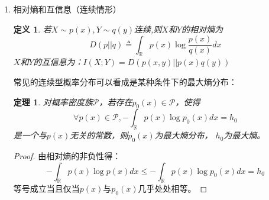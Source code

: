 \documentclass{article}
\newtheorem{definition}{定义}
\newtheorem{thm}{定理}
\newtheorem{pro}{命题}
\begin{document}
\begin{enumerate}
常见分布的微分熵
\begin{pro}
\begin{enumerate}[label=(\alph*)]
\item 区间$(0, a)$ 上的均匀分布的微分熵为 $ \log a $， 可正可负。
\item 方差为$\sigma^2$的高斯分布微分熵的大小为$\frac{1}{2}\log (2\pi e \sigma^2)$，协方差矩阵为$\Sigma$的联合高斯分布微分熵大小为${1\over 2} \log(\det (2\pi e \Sigma ))$
\item 均值为$\frac{1}{\lambda}$的指数分布的微分熵为 $\log e-\log \lambda$
\end{enumerate}
\end{pro}
\begin{proof}
\begin{enumerate}[label=(\alph*)]
\item
不妨设高斯分布$X$的均值为0，概率密度函数为$p(x)$则
\begin{align*}
h(X) = & -\int_{\mathbb{R}} p(x)\log\left(\frac{1}{\sqrt{2\pi \sigma^2}}\exp(-\frac{x^2}{2\sigma^2})\right)dx\\
=& \frac{1}{2}\log(2\pi \sigma^2)+\frac{\log e}{2\sigma^2} \int_{\mathbb{R}} x^2p(x)dx\\
=& \frac{1}{2}\log(2\pi e\sigma^2)
\end{align*}
\item 
$$
h(X)=-\int_{0}^{\infty} \lambda e^{-\lambda x}(\log \lambda -\lambda x \log e)dx=\log e-\log \lambda
$$
\end{enumerate}
\end{proof}

\item 相对熵和互信息（连续情形）
\begin{definition}
若$X\sim p(x),Y\sim q(y)$连续,则$X$和$Y$的相对熵为
\begin{equation}
D(p||q)\triangleq \int_{\mathbb{R}} p(x)\log \frac{p(x)}{q(x)}dx
\end{equation}
$X$和$Y$的互信息为：$I(X;Y)=D(p(x,y)||p(x)q(y))$
\end{definition}

常见的连续型概率分布可以看成是某种条件下的最大熵分布：
\begin{thm}
对概率密度族$\mathcal{P}$，若存在$p_0(x)\in \mathcal{P}$，使得
$$\forall p(x)\in \mathcal{P},-\int_{\mathbb{R}} p(x)\log p_0(x)dx =h_0
$$
 是一个与$p(x)$无关的常数，则$p_0(x)$为最大熵分布，
$h_0$为最大熵。
\end{thm}
\begin{proof}
由相对熵的非负性得：
$$
-\int_{\mathbb{R}} p(x)\log p(x)dx \leq -\int_{\mathbb{R}} p(x)\log p_0(x)dx=h_0
$$
等号成立当且仅当$p(x)$与$p_0(x)$几乎处处相等。
\end{proof}
\end{enumerate}
\end{document}
